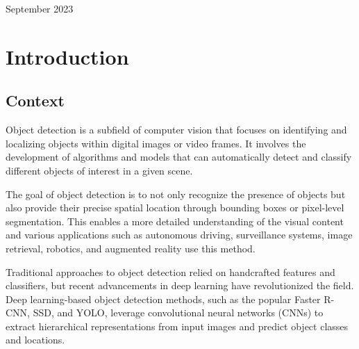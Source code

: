 \begin{titlepage}


{\large September 2023}\\[2cm] %

\vfill %

\end{titlepage}

\tableofcontents
\newpage

\section{Introduction}
\subsection{Context}
Object detection is a subfield of computer vision that focuses on identifying and localizing objects within digital images or video frames. It involves the development of algorithms and models that can automatically detect and classify different objects of interest in a given scene.

The goal of object detection is to not only recognize the presence of objects but also provide their precise spatial location through bounding boxes or pixel-level segmentation. This enables a more detailed understanding of the visual content and various applications such as autonomous driving, surveillance systems, image retrieval, robotics, and augmented reality use this method.

Traditional approaches to object detection relied on handcrafted features and classifiers, but recent advancements in deep learning have revolutionized the field. Deep learning-based object detection methods, such as the popular Faster R-CNN, SSD, and YOLO, leverage convolutional neural networks (CNNs) to extract hierarchical representations from input images and predict object classes and locations.

